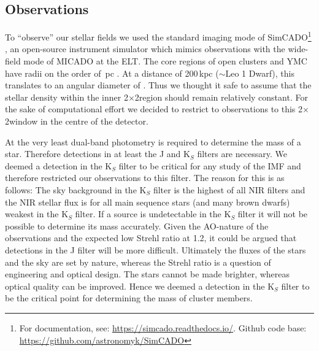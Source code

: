 
\subsection{Observations}
\label{sec:telescope}

To ``observe'' our stellar fields we used the standard imaging mode of SimCADO\footnote{For documentation, see: \url{https://simcado.readthedocs.io/}. Github code base: \url{https://github.com/astronomyk/SimCADO}} \citep{leschinski2016}, an open-source instrument simulator which mimics observations with the wide-field mode of MICADO at the ELT. 
The core regions of open clusters and YMC have radii on the order of \,pc \citep{portegies2010}. 
At a distance of 200\,kpc ($\sim$Leo 1 Dwarf), this translates to an angular diameter of \arcsec. Thus we thought it safe to assume that the stellar density within the inner 2\arcsec$\times$2\arcsec region should remain relatively constant.
For the sake of computational effort we decided to restrict to observations to this 2\arcsec$\times$2\arcsec window in the centre of the detector.

At the very least dual-band photometry is required to determine the mass of a star. Therefore detections in at least the J and K$_S$ filters are necessary. 
We deemed a detection in the K$_S$ filter to be critical for any study of the IMF and therefore restricted our observations to this filter. 
The reason for this is as follows: The sky background in the K$_S$ filter is the highest of all NIR filters and the NIR stellar flux is for all main sequence stars (and many brown dwarfs) weakest in the K$_S$ filter. 
If a source is undetectable in the K$_S$ filter it will not be possible to determine its mass accurately. Given the AO-nature of the observations and the expected low Strehl ratio at 1.2\um \citep{clenet2016}, it could be argued that detections in the J filter will be more difficult. 
Ultimately the fluxes of the stars and the sky are set by nature, whereas the Strehl ratio is a question of engineering and optical design. 
The stars cannot be made brighter, whereas optical quality can be improved. 
Hence we deemed a detection in the K$_S$ filter to be the critical point for determining the mass of cluster members.

